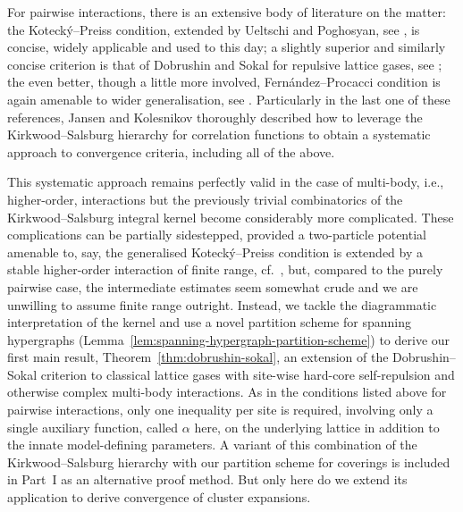 \documentclass[reqno, 11pt]{amsart}
\theoremstyle{definition}
\begin{document}
For pairwise interactions, there is an extensive body of literature on the matter: 
the Koteck{\'y}--Preiss condition, extended by Ueltschi and Poghosyan, see \cite{ref:kotecky-preiss, ref:ueltschi, ref:poghosyan-ueltschi}, is concise, widely applicable and used to this day; 
a slightly superior and similarly concise criterion is that of Dobrushin and Sokal for repulsive lattice gases, see \cite{ref:dobrushin-semi-invariants, ref:dobrushin-saint-flour, ref:sokal, ref:scott-sokal}; 
the even better, though a little more involved, Fern{\'a}ndez--Procacci condition is again amenable to wider generalisation, see \cite{ref:fernandez-procacci, ref:bissacot-fernandez-procacci, ref:faris, ref:jansen-cluster, ref:jansen-kolesnikov}. 
Particularly in the last one of these references, Jansen and Kolesnikov thoroughly described how to leverage the Kirkwood--Salsburg hierarchy for correlation functions to obtain a systematic approach to convergence criteria, including all of the above.

This systematic approach remains perfectly valid in the case of multi-body, i.e., higher-order, interactions but the previously trivial combinatorics of the Kirkwood--Salsburg integral kernel become considerably more complicated. 
These complications can be partially sidestepped, provided a two-particle potential amenable to, say, the generalised Koteck{\'y}--Preiss condition is extended by a stable higher-order interaction of finite range, cf.\ \cite{ref:moraal, ref:skrypnyk}, but, compared to the purely pairwise case, the intermediate estimates seem somewhat crude and we are unwilling to assume finite range outright. 
Instead, we tackle the diagrammatic interpretation of the kernel and use a novel partition scheme for spanning hypergraphs (Lemma~\ref{lem:spanning-hypergraph-partition-scheme}) to derive our first main result, Theorem~\ref{thm:dobrushin-sokal}, an extension of the Dobrushin--Sokal criterion to classical lattice gases with site-wise hard-core self-repulsion and otherwise complex multi-body interactions. 
As in the conditions listed above for pairwise interactions, only one inequality per site is required, involving only a single auxiliary function, called $\alpha$ here, on the underlying lattice in addition to the innate model-defining parameters. 
A variant of this combination of the Kirkwood--Salsburg hierarchy with our partition scheme for coverings is included in Part~I as an alternative proof method. 
But only here do we extend its application to derive convergence of cluster expansions.
\end{document}
